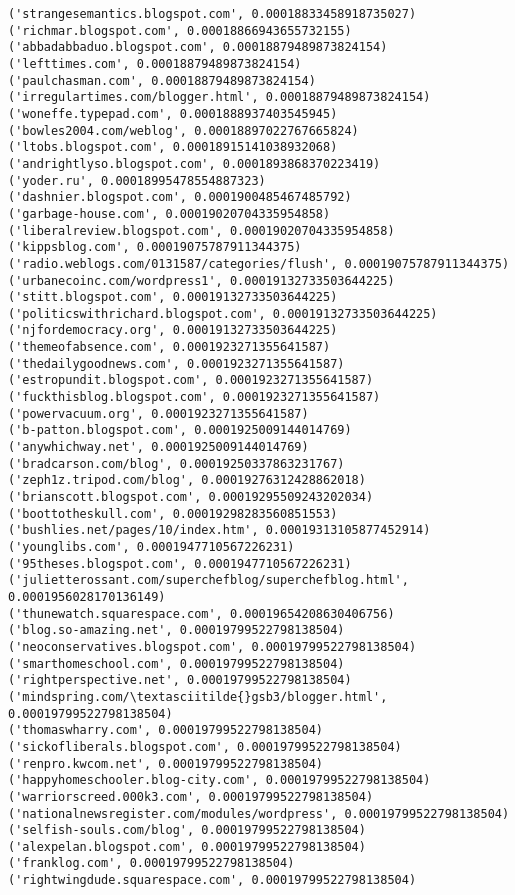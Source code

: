 \documentclass[11pt]{article}
\begin{document}
\begin{Verbatim}[commandchars=\\\{\}]
('strangesemantics.blogspot.com', 0.00018833458918735027)
('richmar.blogspot.com', 0.00018866943655732155)
('abbadabbaduo.blogspot.com', 0.00018879489873824154)
('lefttimes.com', 0.00018879489873824154)
('paulchasman.com', 0.00018879489873824154)
('irregulartimes.com/blogger.html', 0.00018879489873824154)
('woneffe.typepad.com', 0.0001888937403545945)
('bowles2004.com/weblog', 0.00018897022767665824)
('ltobs.blogspot.com', 0.00018915141038932068)
('andrightlyso.blogspot.com', 0.0001893868370223419)
('yoder.ru', 0.00018995478554887323)
('dashnier.blogspot.com', 0.0001900485467485792)
('garbage-house.com', 0.00019020704335954858)
('liberalreview.blogspot.com', 0.00019020704335954858)
('kippsblog.com', 0.00019075787911344375)
('radio.weblogs.com/0131587/categories/flush', 0.00019075787911344375)
('urbanecoinc.com/wordpress1', 0.00019132733503644225)
('stitt.blogspot.com', 0.00019132733503644225)
('politicswithrichard.blogspot.com', 0.00019132733503644225)
('njfordemocracy.org', 0.00019132733503644225)
('themeofabsence.com', 0.0001923271355641587)
('thedailygoodnews.com', 0.0001923271355641587)
('estropundit.blogspot.com', 0.0001923271355641587)
('fuckthisblog.blogspot.com', 0.0001923271355641587)
('powervacuum.org', 0.0001923271355641587)
('b-patton.blogspot.com', 0.0001925009144014769)
('anywhichway.net', 0.0001925009144014769)
('bradcarson.com/blog', 0.00019250337863231767)
('zeph1z.tripod.com/blog', 0.00019276312428862018)
('brianscott.blogspot.com', 0.00019295509243202034)
('boottotheskull.com', 0.00019298283560851553)
('bushlies.net/pages/10/index.htm', 0.00019313105877452914)
('younglibs.com', 0.0001947710567226231)
('95theses.blogspot.com', 0.0001947710567226231)
('julietterossant.com/superchefblog/superchefblog.html', 0.0001956028170136149)
('thunewatch.squarespace.com', 0.00019654208630406756)
('blog.so-amazing.net', 0.00019799522798138504)
('neoconservatives.blogspot.com', 0.00019799522798138504)
('smarthomeschool.com', 0.00019799522798138504)
('rightperspective.net', 0.00019799522798138504)
('mindspring.com/\textasciitilde{}gsb3/blogger.html', 0.00019799522798138504)
('thomaswharry.com', 0.00019799522798138504)
('sickofliberals.blogspot.com', 0.00019799522798138504)
('renpro.kwcom.net', 0.00019799522798138504)
('happyhomeschooler.blog-city.com', 0.00019799522798138504)
('warriorscreed.000k3.com', 0.00019799522798138504)
('nationalnewsregister.com/modules/wordpress', 0.00019799522798138504)
('selfish-souls.com/blog', 0.00019799522798138504)
('alexpelan.blogspot.com', 0.00019799522798138504)
('franklog.com', 0.00019799522798138504)
('rightwingdude.squarespace.com', 0.00019799522798138504)

\end{Verbatim}
\end{document}
